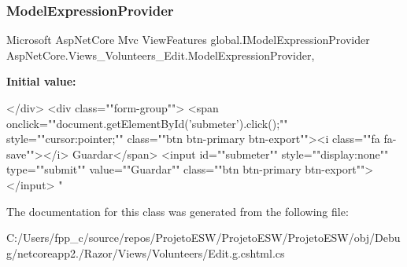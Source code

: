 \subsubsection{\texorpdfstring{Model\+Expression\+Provider}{ModelExpressionProvider}}
{\footnotesize\ttfamily Microsoft Asp\+Net\+Core Mvc View\+Features global.\+I\+Model\+Expression\+Provider Asp\+Net\+Core.\+Views\+\_\+\+Volunteers\+\_\+\+Edit.\+Model\+Expression\+Provider\hspace{0.3cm}{\ttfamily [get]}, {}}

{\bfseries Initial value\+:}
\begin{DoxyCode}

            </div>
            <div \textcolor{keyword}{class}=\textcolor{stringliteral}{""}form-group\textcolor{stringliteral}{""}>
                <span onclick=\textcolor{stringliteral}{""}document.getElementById(\textcolor{stringliteral}{'submeter'}).click();\textcolor{stringliteral}{""} style=\textcolor{stringliteral}{""}cursor:pointer;\textcolor{stringliteral}{""} \textcolor{keyword}{
      class}=\textcolor{stringliteral}{""}btn btn-primary btn-export\textcolor{stringliteral}{""}><i \textcolor{keyword}{class}=\textcolor{stringliteral}{""}fa fa-save\textcolor{stringliteral}{""}></i> Guardar</span>
                <input \textcolor{keywordtype}{id}=\textcolor{stringliteral}{""}submeter\textcolor{stringliteral}{""} style=\textcolor{stringliteral}{""}display:none\textcolor{stringliteral}{""} type=\textcolor{stringliteral}{""}submit\textcolor{stringliteral}{""} value=\textcolor{stringliteral}{""}Guardar\textcolor{stringliteral}{""} \textcolor{keyword}{class}=\textcolor{stringliteral}{""}btn
       btn-primary btn-export\textcolor{stringliteral}{""}></input>
                \textcolor{stringliteral}{"}
\end{DoxyCode}


The documentation for this class was generated from the following file\+:\begin{DoxyCompactItemize}
\item 
C\+:/\+Users/fpp\+\_\+c/source/repos/\+Projeto\+E\+S\+W/\+Projeto\+E\+S\+W/\+Projeto\+E\+S\+W/obj/\+Debug/netcoreapp2./\+Razor/\+Views/\+Volunteers/Edit.\+g.\+cshtml.\+cs\end{DoxyCompactItemize}
